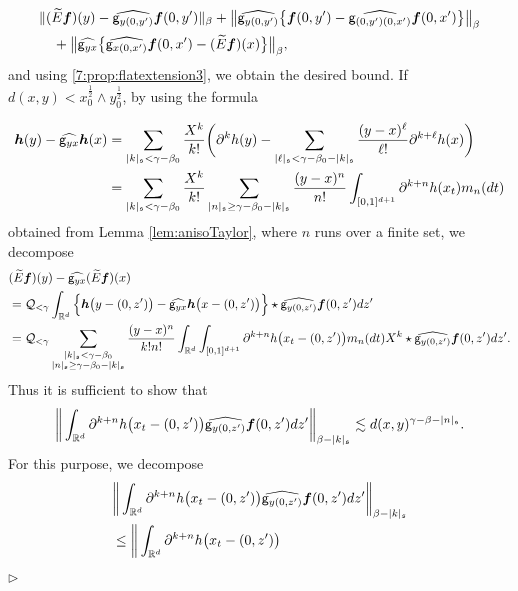 \documentclass[10pt, reqno]{amsart}
\numberwithin{subsection}{section}
\numberwithin{subsubsection}{subsection}
\numberwithin{equation}{section} %
\newenvironment{Dem}[1][\unskip]{%
    \begin{list}{\hspace{1.15cm}{\sf \textbf{{\small Proof #1 --}}}}{%
        \setlength{\topsep}{0pt}%
        \setlength{\leftmargin}{0pt}%
        \setlength{\rightmargin}{0pt}%
        \setlength{\listparindent}{0pt}%
        \setlength{\itemindent}{0pt}%
        \setlength{\parsep}{0pt}%
        \addtolength{\leftmargin}{0pt}%
        \addtolength{\rightmargin}{0pt}%
    } \item }{\hfill $\rhd$\end{list}\smallskip}
\theoremstyle{mystyle}
\theoremstyle{mystyle2}
\theoremstyle{mystyle3}
\newcommand{\bsf}{\boldsymbol{f}}
\newcommand{\bsh}{\boldsymbol{h}}
\newcommand{\mfs}{\mathfrak{s}}
\newcommand\bbR{\mathbb{R}}
\newcommand{\mcQ}{\mathcal{Q}}
\begin{document}
\begin{Dem}
\vfill \pagebreak

\begin{align*}
&\|(\widetilde{E}\bsf)(y)-\widehat{{\sf g}_{y(0,y')}}\bsf(0,y')\|_\beta + \big\|\widehat{{\sf g}_{y(0,y')}}\big\{\bsf(0,y')-\widehat{{\sf g}_{(0,y')(0,x')}}\bsf(0,x')\big\}\big\|_\beta   \\
&\quad+\big\|\widehat{{\sf g}_{yx}}\big\{\widehat{{\sf g}_{x(0,x')}}\bsf(0,x')-(\widetilde{E}\bsf)(x)\big\}\big\|_\beta,
\end{align*}
and using \eqref{7:prop:flatextension3}, we obtain the desired bound. If $d(x,y)<x_0^{\frac12}\wedge y_0^{\frac12}$, by using the formula

\begin{align*}
\bsh(y)-\widehat{{\sf g}_{yx}}\bsh(x)
&=\sum_{|k|_\mfs<\gamma-\beta_0}\frac{X^k}{k!}\bigg(\partial^kh(y)-\sum_{|\ell|_\mfs<\gamma-\beta_0-|k|_\mfs}\frac{(y-x)^\ell}{\ell!}\partial^{k+\ell}h(x)\bigg)\\
&=\sum_{|k|_\mfs<\gamma-\beta_0}\frac{X^k}{k!}
\sum_{|n|_\mfs\ge\gamma-\beta_0-|k|_\mfs}\frac{(y-x)^n}{n!}\int_{[0,1]^{d+1}}\partial^{k+n}h(x_t)m_n(dt)
\end{align*}
obtained from Lemma \ref{lem:anisoTaylor}, where $n$ runs over a finite set, we decompose
\begin{align*}
&(\widetilde{E}\bsf)(y)-\widehat{{\sf g}_{yx}}(\widetilde{E}\bsf)(x)\\
&=\mcQ_{<\gamma}\int_{\bbR^d}\Big\{\bsh\big(y-(0,z')\big)-\widehat{{\sf g}_{yx}}\bsh\big(x-(0,z')\big)\Big\}
\star\widehat{{\sf g}_{y(0,z')}}\bsf(0,z')dz'\\
%
&=\mcQ_{<\gamma}\sum_{\substack{|k|_\mfs<\gamma-\beta_0 \\ |n|_\mfs\ge\gamma-\beta_0-|k|_\mfs}}
\frac{(y-x)^n}{k!n!}\int_{\bbR^d}\int_{[0,1]^{d+1}}
\partial^{k+n}h\big(x_t-(0,z')\big)m_n(dt)X^k\star\widehat{{\sf g}_{y(0,z')}}\bsf(0,z')dz'.
\end{align*}
Thus it is sufficient to show that
\begin{equation}\label{proof:Taylor:thm Whitney extension}
\bigg\|\int_{\bbR^d}\partial^{k+n}h\big(x_t-(0,z')\big)\widehat{{\sf g}_{y(0,z')}}\bsf(0,z')dz'\bigg\|_{\beta-|k|_\mfs}
\lesssim d(x,y)^{\gamma-\beta-|n|_\mfs}.
\end{equation}
For this purpose, we decompose
\begin{align*}
&\bigg\|\int_{\bbR^d}\partial^{k+n}h\big(x_t-(0,z')\big)\widehat{{\sf g}_{y(0,z')}}\bsf(0,z')dz'\bigg\|_{\beta-|k|_\mfs}\\
&\le\bigg\|\int_{\bbR^d}\partial^{k+n}h\big(x_t-(0,z')\big)

\end{align*}
\end{Dem}
\end{document}
